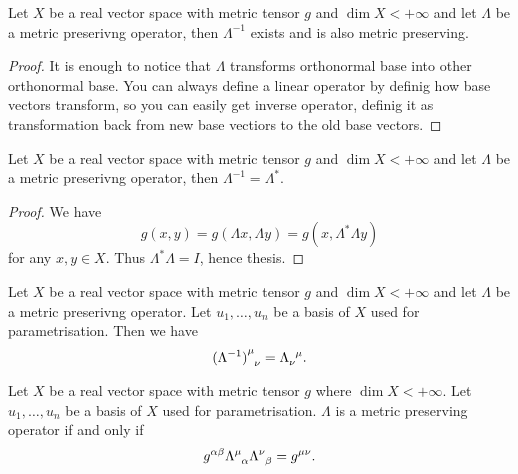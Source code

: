 \documentclass[main.tex]{subfiles}
\begin{document}
\begin{theorem}
\label{metric-preserving-inverse-existence}
Let $X$ be a real vector space with metric tensor $g$ and $\dim X < +\infty$ and let $\Lambda$ be a metric preserivng operator, then $\Lambda^{-1}$ exists and is also metric preserving.
\end{theorem}

\begin{proof}
It is enough to notice that $\Lambda$ transforms orthonormal base into other orthonormal base. You can always define a linear operator by definig how base vectors transform, so you can easily get inverse operator, definig it as transformation back from new base vectiors to the old base vectors. 
\end{proof}

\begin{theorem}
Let $X$ be a real vector space with metric tensor $g$ and $\dim X < +\infty$ and let $\Lambda$ be a metric preserivng operator, then $\Lambda^{-1} = \Lambda^*$.
\end{theorem}

\begin{proof}
We have
\begin{equation}
g(x, y) = g(\Lambda x, \Lambda y) = g(x, \Lambda^* \Lambda y)
\end{equation}
for any $x, y\in X$. Thus $\Lambda^* \Lambda = I$, hence thesis.
\end{proof}

\begin{corollary}
Let $X$ be a real vector space with metric tensor $g$ and $\dim X < +\infty$ and let $\Lambda$ be a metric preserivng operator. Let $u_1, \dots, u_n$ be a basis of $X$ used for parametrisation. Then we have
\begin{equation}
\tensor{{(\Lambda^{-1})}}{^\mu_\nu} = \tensor{\Lambda}{_\nu^\mu}.
\end{equation}
\end{corollary}

\begin{corollary}
Let $X$ be a real vector space with metric tensor $g$ where $\dim X < +\infty$. Let $u_1, \dots, u_n$ be a basis of $X$ used for parametrisation. $\Lambda$ is a metric preserving operator if and only if
\begin{equation}
\label{metric-preserving-equality-2}
g^{\alpha\beta} \tensor{\Lambda}{^\mu_\alpha} \tensor{\Lambda}{^\nu_\beta} = g^{\mu\nu}. 
\end{equation}
\end{corollary}
\end{document}
